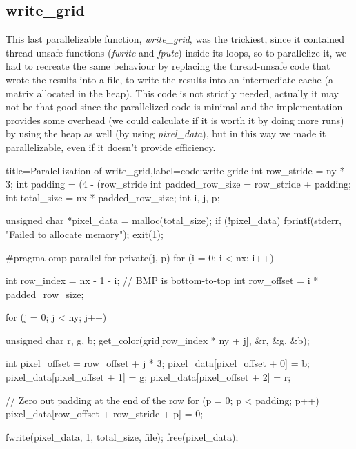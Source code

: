 \documentclass[../main.tex]{subfiles}
\begin{document}
\subsection{write\_grid}

This last parallelizable function, \textit{write\_grid}, was the trickiest, since it contained thread-unsafe functions (\textit{fwrite} and \textit{fputc}) inside its loops, so to parallelize it, we had to recreate the same behaviour by replacing the thread-unsafe code that wrote the results into a file, to write the results into an intermediate cache (a matrix allocated in the heap). 
This code is not strictly needed, actually it may not be that good since the parallelized code is minimal and the implementation provides some overhead (we could calculate if it is worth it by doing more runs) by using the heap as well (by using \textit{pixel\_data}), but in this way we made it parallelizable, even if it doesn't provide efficiency.

\begin{code}[numbers=left]{title=Paralellization of write\_grid,label=code:write-grid}{c}
    int row_stride = ny * 3;
    int padding = (4 - (row_stride %
    int padded_row_size = row_stride + padding;
    int total_size = nx * padded_row_size;
    int i, j, p;

    unsigned char *pixel_data = malloc(total_size);
    if (!pixel_data) {
        fprintf(stderr, "Failed to allocate memory\n");
        exit(1);
    }

    #pragma omp parallel for private(j, p)
    for (i = 0; i < nx; i++) {
        int row_index = nx - 1 - i; // BMP is bottom-to-top
        int row_offset = i * padded_row_size;

        for (j = 0; j < ny; j++) {
            unsigned char r, g, b;
            get_color(grid[row_index * ny + j], &r, &g, &b);

            int pixel_offset = row_offset + j * 3;
            pixel_data[pixel_offset + 0] = b;
            pixel_data[pixel_offset + 1] = g;
            pixel_data[pixel_offset + 2] = r;
        }

        // Zero out padding at the end of the row
        for (p = 0; p < padding; p++) {
            pixel_data[row_offset + row_stride + p] = 0;
        }
    }

    fwrite(pixel_data, 1, total_size, file);
    free(pixel_data);
\end{code}
\end{document}
